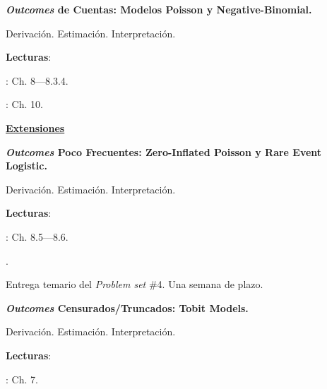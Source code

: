 \documentclass[letterpaper]{article}
\renewenvironment{itemize}{
  \begin{list}{}{
    \setlength{\leftmargin}{1.5em}
  }
}{
  \end{list}
}
\begin{document}
\begin{enumerate}[label=\roman*.]
       \begin{itemize} 
        \item[17.] {\bf \emph{Outcomes} de Cuentas: Modelos Poisson y Negative-Binomial.}
        \begin{itemize} 
          \item[$\circ$] Derivaci\'on. Estimaci\'on. Interpretaci\'on.
          \item[$\circ$] {\bf Lecturas}: 
            \begin{itemize} 
              \item[$\diamond$] \textcite{Long2001}: Ch. 8---8.3.4.
              \item[$\diamond$] \textcite{Ward2018}: Ch. 10.
            \end{itemize}
        \end{itemize}
      \end{itemize}



\item {\bf {\color{ForestGreen}\underline{Extensiones}}}

      \begin{itemize} 
        \item[18.] {\bf \emph{Outcomes} Poco Frecuentes: Zero-Inflated Poisson y Rare Event Logistic.}
        \begin{itemize} 
          \item[$\circ$] Derivaci\'on. Estimaci\'on. Interpretaci\'on.
          \item[$\circ$] {\bf Lecturas}: 
            \begin{itemize} 
              \item[$\diamond$] \textcite{Long2001}: Ch. 8.5---8.6.
              \item[$\diamond$] \href{https://github.com/hbahamonde/MLE/raw/master/Readings/King_2001.pdf}{\textcite{King2001}}.
            \end{itemize}
        \end{itemize}
      \end{itemize}


\item[{\color{red}\Pointinghand}] Entrega temario del \emph{Problem set} \#4. Una semana de plazo.


     \begin{itemize} 
        \item[19.] {\bf \emph{Outcomes} Censurados/Truncados: Tobit Models.}
        \begin{itemize} 
          \item[$\circ$] Derivaci\'on. Estimaci\'on. Interpretaci\'on.
          \item[$\circ$] {\bf Lecturas}: 
            \begin{itemize} 
              \item[$\diamond$] \textcite{Long2001}: Ch. 7.
            \end{itemize}
        \end{itemize}
      \end{itemize}



\end{enumerate}
\end{document}
